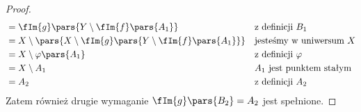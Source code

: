 \begin{proof}
\begin{align*}
		 & = \fIm{g}\pars{Y \setminus \fIm{f}\pars{A_1}}                                &  & \text{z~definicji \(B_1\)}         \\
		 & = X \setminus \pars{X \setminus \fIm{g}\pars{Y \setminus \fIm{f}\pars{A_1}}} &  & \text{jesteśmy w~uniwersum \(X\)}  \\
		 & = X \setminus \varphi\pars{A_1}                                              &  & \text{z~definicji \(\varphi\)}     \\
		 & = X \setminus A_1                                                            &  & \text{\(A_1\)~jest punktem stałym} \\
		 & = A_2                                                                        &  & \text{z~definicji \(A_2\)}
	\end{align*}
	Zatem również drugie wymaganie \(\fIm{g}\pars{B_2} = A_2\) jest spełnione.
\end{proof}
